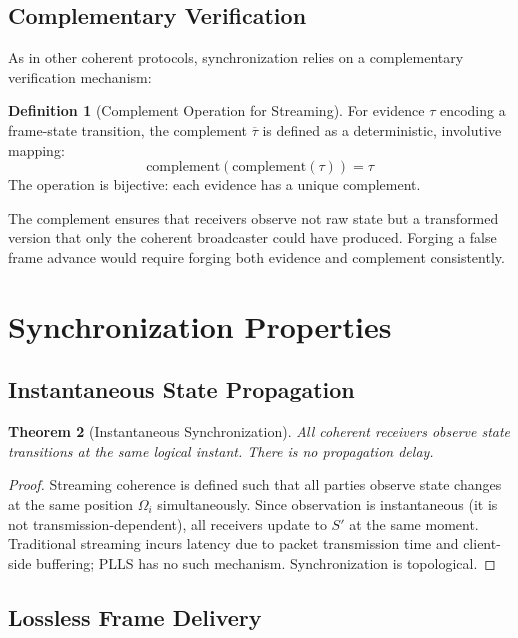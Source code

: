 \documentclass[twocolumn,10pt,a4paper]{article}
\theoremstyle{plain}
\newtheorem{theorem}{Theorem}[section]
\theoremstyle{definition}
\newtheorem{definition}[theorem]{Definition}
\begin{document}
\subsection{Complementary Verification}

As in other coherent protocols, synchronization relies on a complementary verification mechanism:

\begin{definition}[Complement Operation for Streaming]
For evidence $\tau$ encoding a frame-state transition, the complement $\overline{\tau}$ is defined as a deterministic, involutive mapping:
\[
\mathrm{complement}(\mathrm{complement}(\tau)) = \tau
\]
The operation is bijective: each evidence has a unique complement.
\end{definition}

The complement ensures that receivers observe not raw state but a transformed version that only the coherent broadcaster could have produced. Forging a false frame advance would require forging both evidence and complement consistently.

\section{Synchronization Properties}
\label{sec:properties}

\subsection{Instantaneous State Propagation}

\begin{theorem}[Instantaneous Synchronization]
All coherent receivers observe state transitions at the same logical instant. There is no propagation delay.
\end{theorem}

\begin{proof}
Streaming coherence is defined such that all parties observe state changes at the same position $\Omega_i$ simultaneously. Since observation is instantaneous (it is not transmission-dependent), all receivers update to $S'$ at the same moment. Traditional streaming incurs latency due to packet transmission time and client-side buffering; PLLS has no such mechanism. Synchronization is topological.
\end{proof}

\subsection{Lossless Frame Delivery}
\end{document}
